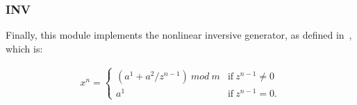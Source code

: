 \subsubsection{INV}
Finally, this module implements the nonlinear inversive generator, as defined in~\cite{Lecuyer2009}, which is:

\begin{equation}
\label{INV}
\begin{array}{l}
x^n=\left\{
\begin{array}{ll}
(a^1 + a^2 / z^{n-1})~mod~m & \text{if}~ z^{n-1} \neq 0 \\
a^1 & \text{if}~  z^{n-1} = 0 .\end{array} \right. \end{array}\end{equation}


